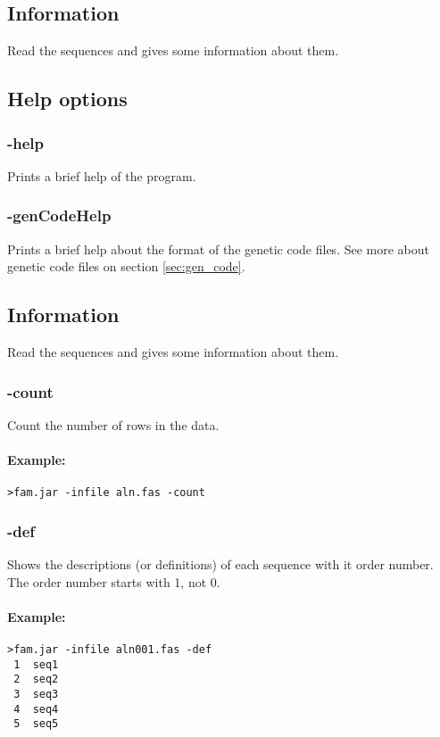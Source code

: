 \documentclass[a4paper, twoside,10pt]{article}
\begin{document}
\subsection{Information}
Read the sequences and gives some information about them.

\subsection{Help options}
\subsubsection{-help}
Prints a brief help of the program.
\subsubsection{-genCodeHelp}
Prints a brief help about the format of the genetic code files. See more 
about genetic code files on section \ref{sec:gen_code}. 

\subsection{Information}
Read the sequences and gives some information about them.

\subsubsection{-count}
Count the number of rows in the data.
\paragraph{Example:}
\begin{verbatim}
>fam.jar -infile aln.fas -count
\end{verbatim}

\subsubsection{-def}
Shows the descriptions (or definitions) of each sequence with it order number.
The order number starts with 1, not 0.  
\paragraph{Example:}
\begin{verbatim}
>fam.jar -infile aln001.fas -def
 1	seq1
 2	seq2
 3	seq3
 4	seq4
 5	seq5
\end{verbatim}
\end{document}
